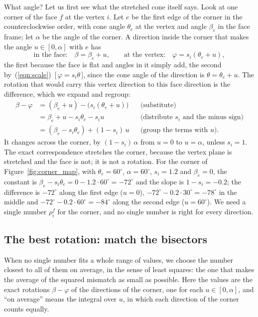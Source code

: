 What angle? Let us first see what the stretched cone itself says. Look at one corner of the face $f$ at the vertex $i$. Let $e$ be the first edge of the corner in the counterclockwise order, with cone angle $\theta_e$ at the vertex and angle $\beta_e$ in the face frame; let $\alpha$ be the angle of the corner. A direction inside the corner that makes the angle $u \in [0, \alpha]$ with $e$ has
\begin{equation*}
\text{in the face:}\quad \beta = \beta_e + u, \qquad \text{at the vertex:}\quad \varphi = s_i (\theta_e + u),
\end{equation*}
the first because the face is flat and angles in it simply add, the second by~(\ref{eqn:scale})~[\,$\varphi = s_i\theta$\,], since the cone angle of the direction is $\theta = \theta_e + u$. The rotation that would carry this vertex direction to this face direction is the difference, which we expand and regroup:
\begin{align*}
\beta - \varphi &= (\beta_e + u) - \big(s_i (\theta_e + u)\big) && \text{(substitute)} \\
&= \beta_e + u - s_i\theta_e - s_i u && \text{(distribute $s_i$ and the minus sign)} \\
&= (\beta_e - s_i \theta_e) + (1 - s_i)\, u && \text{(group the terms with $u$).}
\end{align*}
It changes across the corner, by $(1 - s_i)\, \alpha$ from $u = 0$ to $u = \alpha$, unless $s_i = 1$. The exact correspondence stretches the corner, because the vertex plane is stretched and the face is not; it is not a rotation. For the corner of Figure~\ref{fig:corner_map}, with $\theta_e = 60^\circ$, $\alpha = 60^\circ$, $s_i = 1.2$ and $\beta_e = 0$, the constant is $\beta_e - s_i\theta_e = 0 - 1.2\cdot 60^\circ = -72^\circ$ and the slope is $1 - s_i = -0.2$; the difference is $-72^\circ$ along the first edge ($u = 0$), $-72^\circ - 0.2\cdot 30^\circ = -78^\circ$ in the middle and $-72^\circ - 0.2 \cdot 60^\circ = -84^\circ$ along the second edge ($u = 60^\circ$). We need a single number $\rho_i^f$ for the corner, and no single number is right for every direction.

\subsection{The best rotation: match the bisectors}

When no single number fits a whole range of values, we choose the number closest to all of them on average, in the sense of least squares: the one that makes the average of the squared mismatch as small as possible. Here the values are the exact rotations $\beta - \varphi$ of the directions of the corner, one for each $u \in [0, \alpha]$, and ``on average'' means the integral over $u$, in which each direction of the corner counts equally.

